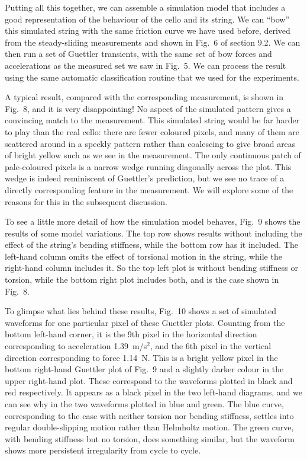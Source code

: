   Putting all this together, we can assemble a simulation model that includes a 
  good representation of the behaviour of the cello and its string. We can 
  “bow” this simulated string with the same friction curve we have used before, 
  derived from the steady-sliding measurements and shown in Fig.\ 6 of section 
  9.2. We can then run a set of Guettler transients, with the same set of bow 
  forces and accelerations as the measured set we saw in Fig.\ 5. We can 
  process the result using the same automatic classification routine that we 
  used for the experiments. 

  A typical result, compared with the corresponding measurement, is shown in 
  Fig.\ 8, and it is very disappointing! No aspect of the simulated pattern 
  gives a convincing match to the measurement. This simulated string would be 
  far harder to play than the real cello: there are fewer coloured pixels, and 
  many of them are scattered around in a speckly pattern rather than coalescing 
  to give broad areas of bright yellow such as we see in the measurement. The 
  only continuous patch of pale-coloured pixels is a narrow wedge running 
  diagonally across the plot. This wedge is indeed reminiscent of Guettler's 
  prediction, but we see no trace of a directly corresponding feature in the 
  measurement. We will explore some of the reasons for this in the subsequent 
  discussion. 

  To see a little more detail of how the simulation model behaves, Fig.\ 9 
  shows the results of some model variations. The top row shows results without 
  including the effect of the string's bending stiffness, while the bottom row 
  has it included. The left-hand column omits the effect of torsional motion in 
  the string, while the right-hand column includes it. So the top left plot is 
  without bending stiffness or torsion, while the bottom right plot includes 
  both, and is the case shown in Fig.\ 8. 

  To glimpse what lies behind these results, Fig.\ 10 shows a set of simulated 
  waveforms for one particular pixel of these Guettler plots. Counting from the 
  bottom left-hand corner, it is the 9th pixel in the horizontal direction 
  corresponding to acceleration 1.39~m/s$^2$, and the 6th pixel in the vertical 
  direction corresponding to force 1.14~N. This is a bright yellow pixel in the 
  bottom right-hand Guettler plot of Fig.\ 9 and a slightly darker colour in 
  the upper right-hand plot. These correspond to the waveforms plotted in black 
  and red respectively. It appears as a black pixel in the two left-hand 
  diagrams, and we can see why in the two waveforms plotted in blue and green. 
  The blue curve, corresponding to the case with neither torsion nor bending 
  stiffness, settles into regular double-slipping motion rather than Helmholtz 
  motion. The green curve, with bending stiffness but no torsion, does 
  something similar, but the waveform shows more persistent irregularity from 
  cycle to cycle. 

